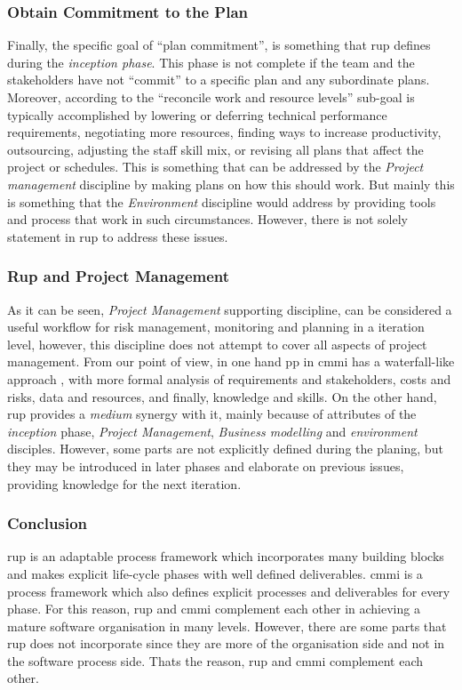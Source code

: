 \subsubsection{Obtain Commitment to the Plan}
Finally, the specific goal of ``plan commitment'', is something that \ac{rup} defines during the \textit{inception phase}. This phase is not complete if the team and the stakeholders have not ``commit'' to a specific plan and any subordinate plans. Moreover, according to \citep{team2010cmmi} the ``reconcile work and resource levels'' sub-goal is typically accomplished by lowering or deferring technical performance requirements, negotiating more resources, finding ways to increase productivity, outsourcing, adjusting the staff skill mix, or revising all plans that affect the project or schedules. 
This is something that can be addressed by the \textit{Project management} discipline by making plans on how this should work. But mainly this is something that the \textit{Environment} discipline would address by providing tools and process that work in such circumstances. However, there is not solely statement in \ac{rup} to address these issues. 

\subsubsection{Rup and Project Management}
As it can be seen, \textit{Project Management} supporting discipline, can be considered a useful workflow for risk management, monitoring and planning in a iteration level, however, this discipline does not attempt to cover all aspects of project management. From our point of view, in one hand \ac{pp} in \ac{cmmi} has a waterfall-like approach \citep{gallagher2001rational}, with more formal analysis of requirements and stakeholders, costs and risks, data and resources, and finally, knowledge and skills. On the other hand, \ac{rup} provides a \textit{medium} synergy with it, mainly because of attributes of the \textit{inception} phase, \textit{Project Management}, \textit{Business modelling} and \textit{environment} disciples. However, some parts are not explicitly defined during the planing, but they may be introduced in later phases and elaborate on previous issues, providing knowledge for the next iteration.

\subsubsection{Conclusion}
\ac{rup} is an adaptable process framework which incorporates many building blocks and makes explicit life-cycle phases with well defined deliverables. 
\ac{cmmi} is a process framework which also defines explicit processes and deliverables for every phase. For this reason, \ac{rup} and \ac{cmmi} complement each other in achieving a mature software organisation in many levels. However, there are some parts that \ac{rup} does not incorporate since they are more of the organisation side and not in the software process side. Thats the reason, \ac{rup} and \ac{cmmi} complement each other. 

